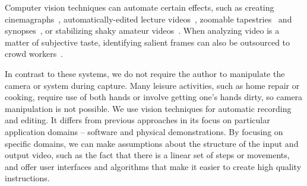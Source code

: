 
Computer vision techniques can automate certain effects, such as creating cinemagraphs~\cite{Bai:2012, Joshi:2012}, automatically-edited lecture videos~\cite{Heck:2007}, zoomable tapestries~\cite{Barnes:2010} and synopses~\cite{Pritch:2009vl}, or stabilizing shaky amateur videos~\cite{Liu:2011}. When analyzing video is a matter of subjective taste, identifying salient frames can also be outsourced to crowd workers~\cite{Bernstein:2011uj}.

In contrast to these systems, we do not require the author to manipulate the camera or system during capture. Many leisure activities, such as home repair or cooking, require use of both hands or involve getting one's hands dirty, so camera manipulation is not possible. We use vision techniques for automatic recording and editing. It differs from previous approaches in its focus on particular application domains -- software and physical demonstrations. By focusing on specific domains, we can make assumptions about the structure of the input and output video, such as the fact that there is a linear set of steps or movements, and offer user interfaces and algorithms that make it easier to create high quality instructions.
